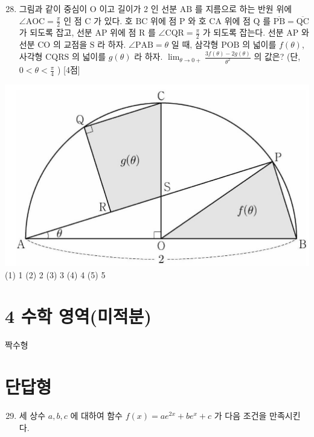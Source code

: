 \documentclass[10pt]{article}
\begin{document}
\begin{enumerate}
  \setcounter{enumi}{27}
  \item 그림과 같이 중심이 $\mathrm{O}$ 이고 길이가 2 인 선분 $\mathrm{AB}$ 를 지름으로 하는 반원 위에 $\angle \mathrm{AOC}=\frac{\pi}{2}$ 인 점 $\mathrm{C}$ 가 있다. 호 $\mathrm{BC}$ 위에 점 $\mathrm{P}$ 와 호 $\mathrm{CA}$ 위에 점 $\mathrm{Q}$ 를 $\overline{\mathrm{PB}}=\overline{\mathrm{QC}}$ 가 되도록 잡고, 선분 $\mathrm{AP}$ 위에 점 $\mathrm{R}$ 를 $\angle \mathrm{CQR}=\frac{\pi}{2}$ 가 되도록 잡는다. 선분 $\mathrm{AP}$ 와 선분 $\mathrm{CO}$ 의 교점을 $\mathrm{S}$ 라 하자. $\angle \mathrm{PAB}=\theta$ 일 때, 삼각형 $\mathrm{POB}$ 의 넓이를 $f(\theta)$, 사각형 $\mathrm{CQRS}$ 의 넓이를 $g(\theta)$ 라 하자. $\lim _{\theta \rightarrow 0+} \frac{3 f(\theta)-2 g(\theta)}{\theta^{2}}$ 의 값은? (단, $0<\theta<\frac{\pi}{4}$ ) [4점]
\end{enumerate}

\includegraphics[max width=\textwidth, center]{2023_06_06_b380aa8523ec7afae994g-35(1)}
(1) 1
(2) 2
(3) 3
(4) 4
(5) 5

\section{4 수학 영역(미적분)}
짝수형

\section{단답형}
\begin{enumerate}
  \setcounter{enumi}{28}
  \item 세 상수 $a, b, c$ 에 대하여 함수 $f(x)=a e^{2 x}+b e^{x}+c$ 가 다음 조건을 만족시킨다.
\end{enumerate}
\end{document}
